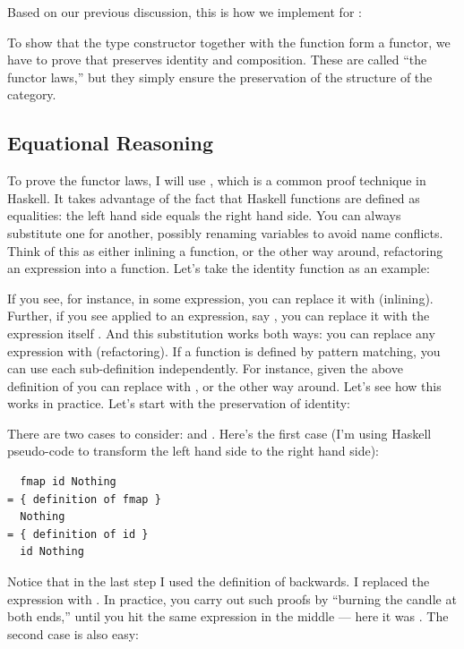 Based on our previous discussion, this is how we implement 
for :

To show that the type constructor  together with the
function  form a functor, we have to prove that
 preserves identity and composition. These are called ``the
functor laws,'' but they simply ensure the preservation of the structure
of the category.

\subsection{Equational Reasoning}

To prove the functor laws, I will use , which
is a common proof technique in Haskell. It takes advantage of the fact
that Haskell functions are defined as equalities: the left hand side
equals the right hand side. You can always substitute one for another,
possibly renaming variables to avoid name conflicts. Think of this as
either inlining a function, or the other way around, refactoring an
expression into a function. Let's take the identity function as an
example:

If you see, for instance,  in some expression, you can
replace it with  (inlining). Further, if you see 
applied to an expression, say , you can replace it
with the expression itself . And this substitution
works both ways: you can replace any expression  with
 (refactoring). If a function is defined by pattern
matching, you can use each sub-definition independently. For instance,
given the above definition of  you can replace
 with , or the other way
around. Let's see how this works in practice. Let's start with the
preservation of identity:

There are two cases to consider:  and .
Here's the first case (I'm using Haskell pseudo-code to transform the
left hand side to the right hand side):

\begin{Verbatim}
  fmap id Nothing
= { definition of fmap }
  Nothing
= { definition of id } 
  id Nothing
\end{Verbatim}
Notice that in the last step I used the definition of 
backwards. I replaced the expression  with
. In practice, you carry out such proofs by
``burning the candle at both ends,'' until you hit the same expression
in the middle --- here it was . The second case is also
easy:

